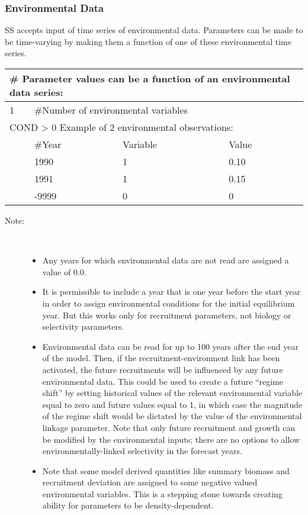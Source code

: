 \subsubsection{Environmental Data}
SS accepts input of time series of environmental data.  Parameters can be made to be time-varying by making them a function of one of these environmental time series.

\begin{center}
	\begin{tabular}{p{1cm} p{3cm} p{3cm} p{8cm}}
		\multicolumn{4}{l}{\# Parameter values can be a function of an environmental data series: }\\
		\hline
		1 & \multicolumn{3}{l}{\#Number of environmental variables}\\
		\hline
		\multicolumn{4}{l}{COND > 0  Example of 2 environmental observations:} \\
		  & \#Year & Variable & Value \\
		\hline
		  & 1990 & 1 & 0.10 \\
		  & 1991 & 1 & 0.15 \\
		  & -9999 & 0 & 0 \\
		\hline
	\end{tabular}
\end{center}

\begin{description}
	\item[Note:]\
	\begin{itemize}
		\item Any years for which environmental data are not read are assigned a value of 0.0.
		\item It is permissible to include a year that is one year before the start year in order to assign environmental conditions for the initial equilibrium year.  But this works only for recruitment parameters, not biology or selectivity parameters.
		\item Environmental data can be read for up to 100 years after the end year of the model.  Then, if the recruitment-environment link has been activated, the future recruitments will be influenced by any future environmental data.  This could be used to create a future “regime shift” by setting historical values of the relevant environmental variable equal to zero and future values equal to 1, in which case the magnitude of the regime shift would be dictated by the value of the environmental linkage parameter.  Note that only future recruitment and growth can be modified by the environmental inputs; there are no options to allow environmentally-linked selectivity in the forecast years.
		\item Note that some model derived quantities like summary biomass and recruitment deviation are assigned to some negative valued environmental variables.  This is a stepping stone towards creating ability for parameters to be density-dependent.
	\end{itemize}
\end{description}

